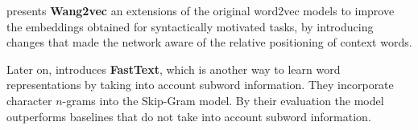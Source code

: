  presents \textbf{Wang2vec} an extensions of the original word2vec models to improve the embeddings obtained for syntactically motivated tasks, by introducing changes that made the network aware of the relative positioning of context words.

Later on,  introduces \textbf{FastText}, which is another way to learn word representations by taking into account subword information. They incorporate character $n$-grams into the Skip-Gram model. By their evaluation the model outperforms baselines that do not take into account subword information.




